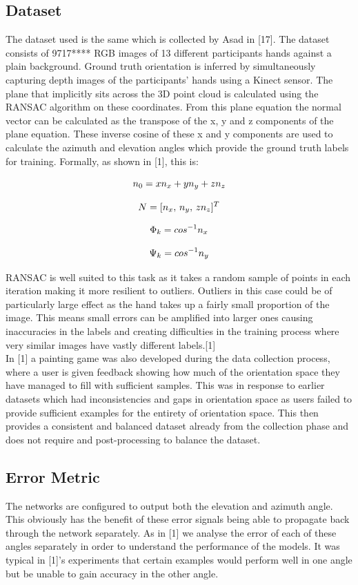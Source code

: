 \documentclass{article}
\begin{document}
\subsection{Dataset}
The dataset used is the same which is collected by Asad in [17]. The dataset consists of 9717**** RGB images of 13 different participants hands against a plain background. Ground truth orientation is inferred by simultaneously capturing depth images of the participants' hands using a Kinect sensor. The plane that implicitly sits across the 3D point cloud is calculated using the RANSAC algorithm on these coordinates. From this plane equation the normal vector can be calculated as the transpose of the x, y and z components of the plane equation. These inverse cosine of these x and y components are used to calculate the azimuth and elevation angles which provide the ground truth labels for training. Formally, as shown in [1], this is:

\[\emph{$n_{0}$} =  \emph{$xn_{x}$} + \emph{$yn_{y}$} + \emph{$zn_{z}$}\]

\[\emph{$N$} =  [\emph{$n_{x}$},\, \emph{$n_{y}$},\, \emph{$zn_{z}$}]^T\]

\[\emph{$\Phi_{k}$} =  \emph{$cos^{-1}n_{x}$}\]

\[\emph{$\Psi_{k}$} =  \emph{$cos^{-1}n_{y}$}\]

RANSAC is well suited to this task as it takes a random sample of points in each iteration making it more resilient to outliers. Outliers in this case could be of particularly large effect as the hand takes up a fairly small proportion of the image. This means small errors can be amplified into larger ones causing inaccuracies in the labels and creating difficulties in the training process where very similar images have vastly different labels.[1]\\

In [1] a painting game was also developed during the data collection process, where a user is given feedback showing how much of the orientation space they have managed to fill with sufficient samples. This was in response to earlier datasets which had inconsistencies and gaps in orientation space as users failed to provide sufficient examples for the entirety of orientation space. This then provides a consistent and balanced dataset already from the collection phase and does not require and post-processing to balance the dataset.

\subsection{Error Metric}
The networks are configured to output both the elevation and azimuth angle. This obviously has the benefit of these error signals being able to propagate back through the network separately. As in [1] we analyse the error of each of these angles separately in order to understand the performance of the models. It was typical in [1]'s experiments that certain examples would perform well in one angle but be unable to gain accuracy in the other angle.\\
\end{document}

